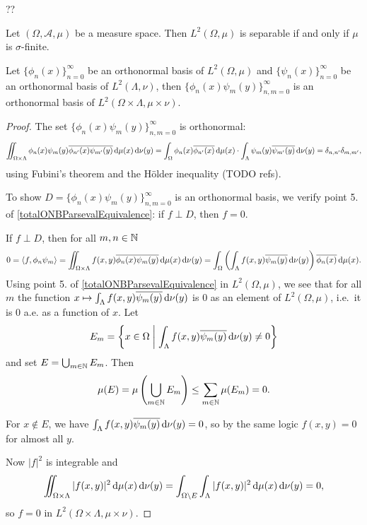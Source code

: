 ??
\begin{lemma}
Let $(\Omega,\mathcal{A}, \mu)$ be a measure space. Then $L^2(\Omega, \mu)$ is separable \textup{if and only if} $\mu$ is $\sigma$-finite.
\end{lemma}

\begin{lemma}
Let $\{\phi_n(x)\}^\infty_{n=0}$ be an orthonormal basis of $L^2(\Omega, \mu)$ and $\{\psi_n(x)\}^\infty_{n=0}$ be an orthonormal basis of $L^2(\Lambda, \nu)$, then $\{\phi_n(x)\psi_m(y)\}^\infty_{n,m=0}$ is an orthonormal basis of $L^2(\Omega\times\Lambda, \mu\times\nu)$.
\end{lemma}
\begin{proof}
The set $\{\phi_n(x)\psi_m(y)\}^\infty_{n,m=0}$ is orthonormal:
\[ \iint_{\Omega\times\Lambda} \phi_n(x)\psi_m(y)\overline{\phi_{n'}(x)\psi_{m'}(y)}\operatorname{d \!}{\mu(x)}\operatorname{d \!}{\nu(y)} = \int_\Omega\phi_n(x)\overline{\phi_{n'}(x)}\operatorname{d \!}{\mu(x)} \cdot \int_\Lambda\psi_m(y)\overline{\psi_{m'}(y)}\operatorname{d \!}{\nu(y)} = \delta_{n,n'}\delta_{m,m'}, \]
using Fubini's theorem and the Hölder inequality (TODO refs).

To show $D = \{\phi_n(x)\psi_m(y)\}^\infty_{n,m=0}$ is an orthonormal basis, we verify point 5. of \ref{totalONBParsevalEquivalence}: if $f\perp D$, then $f = 0$.

If $f\perp D$, then for all $m,n\in \mathbb{N}$
\[ 0 = \inner{f, \phi_n\psi_m} = \iint_{\Omega\times\Lambda}f(x,y)\overline{\phi_n(x)\psi_m(y)}\diff{\mu(x)}\diff{\nu(y)} = \int_\Omega \left(\int_\Lambda f(x,y)\overline{\psi_m(y)}\diff{\nu(y)} \right)\overline{\phi_n(x)}\diff{\mu(x)}.  \]
Using point 5. of \ref{totalONBParsevalEquivalence} in $L^2(\Omega,\mu)$, we see that for all $m$ the function $x\mapsto\int_\Lambda f(x,y)\overline{\psi_m(y)}\operatorname{d \!}{\nu(y)}$ is $0$ as an element of $L^2(\Omega, \mu)$, i.e.\ it is $0$ a.e. as a function of $x$. Let
\[ E_m = \setbuilder{x\in\Omega}{ \int_\Lambda f(x,y)\overline{\psi_m(y)}\diff{\nu(y)} \neq 0} \]
and set $E = \bigcup_{m\in\mathbb{N}}E_m$.
Then
\[ \mu(E) =  \mu\left(\bigcup_{m\in \mathbb{N}}E_m\right) \leq \sum_{m\in\mathbb{N}}\mu(E_m) = 0. \]

For $x\notin E$, we have $\int_\Lambda f(x,y)\overline{\psi_m(y)}\operatorname{d \!}{\nu(y)} = 0$, so by the same logic $f(x,y) = 0$ for almost all $y$. 

Now $|f|^2$ is integrable and
\[ \iint_{\Omega\times \Lambda}|f(x,y)|^2\operatorname{d \!}{\mu(x)}\operatorname{d \!}{\nu(y)} = \int_{\Omega\setminus E}\int_\Lambda |f(x,y)|^2\operatorname{d \!}{\mu(x)}\operatorname{d \!}{\nu(y)} = 0, \]
so $f=0$ in $L^2(\Omega\times\Lambda, \mu\times\nu)$.
\end{proof}

